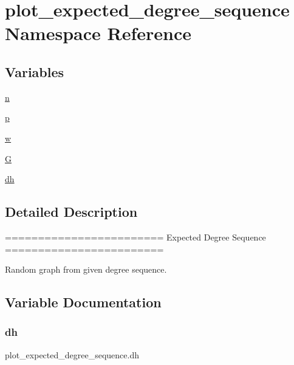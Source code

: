 \hypertarget{namespaceplot__expected__degree__sequence}{}\section{plot\+\_\+expected\+\_\+degree\+\_\+sequence Namespace Reference}
\label{namespaceplot__expected__degree__sequence}
\subsection*{Variables}
\begin{DoxyCompactItemize}
\item 
\hyperlink{namespaceplot__expected__degree__sequence_af3e3b9bc1dfd67bd970c068be62620b1}{n}
\item 
\hyperlink{namespaceplot__expected__degree__sequence_a9b991a845d50a22edc4052056cbfd118}{p}
\item 
\hyperlink{namespaceplot__expected__degree__sequence_a95bda1b1d596da855608b34134e92945}{w}
\item 
\hyperlink{namespaceplot__expected__degree__sequence_aafc949738ca6d6718a7b9387602daf6f}{G}
\item 
\hyperlink{namespaceplot__expected__degree__sequence_a541c123f695d7d57ab95e9f529ffe9cc}{dh}
\end{DoxyCompactItemize}


\subsection{Detailed Description}
\begin{DoxyVerb}========================
Expected Degree Sequence
========================

Random graph from given degree sequence.
\end{DoxyVerb}
 

\subsection{Variable Documentation}
\mbox{\label{namespaceplot__expected__degree__sequence_a541c123f695d7d57ab95e9f529ffe9cc}} 
\subsubsection{\texorpdfstring{dh}{dh}}
{\footnotesize\ttfamily plot\+\_\+expected\+\_\+degree\+\_\+sequence.\+dh}


